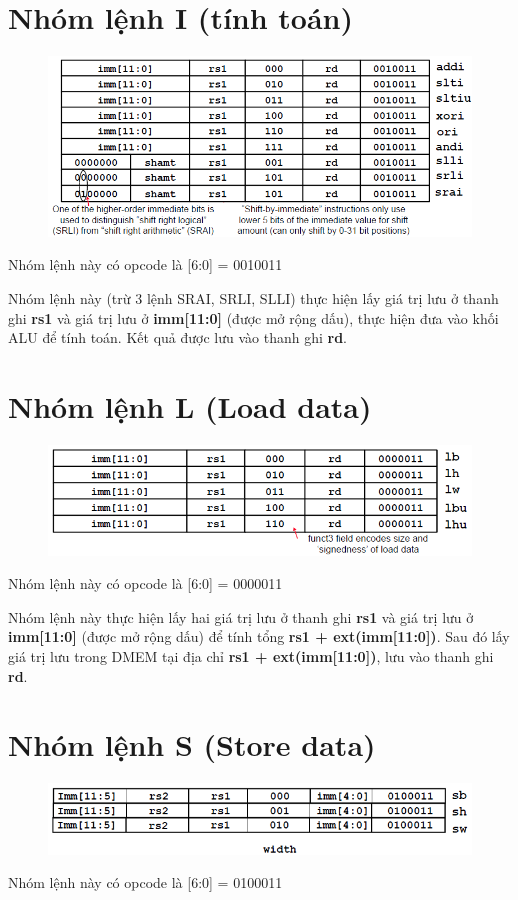 \documentclass[E:/Latex/ExtraWork/ComputerArchitechture/Report.tex]{subfiles}
\begin{document}
\section{Nhóm lệnh I (tính toán)}
			
			\begin{figure}[h!]
				\includegraphics[scale = 0.9]{Figure/Fig4.png}
				\centering
			\end{figure}	

	Nhóm lệnh này có opcode là [6:0] = 0010011

	Nhóm lệnh này (trừ 3 lệnh SRAI, SRLI, SLLI) thực hiện lấy giá trị lưu ở thanh ghi \textbf{rs1} và giá trị lưu ở \textbf{imm[11:0]} (được mở rộng dấu), thực hiện đưa vào khối ALU để tính toán. Kết quả được lưu vào thanh ghi \textbf{rd}.
	\newpage

\section{Nhóm lệnh L (Load data)}
			\begin{figure}[h!]
				\includegraphics[scale = 0.9]{Figure/Fig5.png}
				\centering
			\end{figure}	
	Nhóm lệnh này có opcode là [6:0] = 0000011

	Nhóm lệnh này thực hiện lấy hai giá trị lưu ở thanh ghi \textbf{rs1} và giá trị lưu ở \textbf{imm[11:0]} (được mở rộng dấu) để tính tổng \textbf{rs1 + ext(imm[11:0])}. Sau đó lấy giá trị lưu trong DMEM tại địa chỉ \textbf{rs1 + ext(imm[11:0])}, lưu vào thanh ghi \textbf{rd}.

\section{Nhóm lệnh S (Store data)}
			\begin{figure}[h!]
				\includegraphics[scale = 0.9]{Figure/Fig6.png}
				\centering
			\end{figure}	
	Nhóm lệnh này có opcode là [6:0] = 0100011
\end{document}
